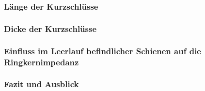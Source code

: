 \documentclass[accentcolor=tud9b, colorbacktitle, inverttitle]{tudbeamer}
\begin{document}
\begin{frame}\frametitle{Länge der Kurzschlüsse}
\end{frame}


\begin{frame}\frametitle{Dicke der Kurzschlüsse}
\end{frame}




\begin{frame}\frametitle{Einfluss im Leerlauf befindlicher Schienen auf die Ringkernimpedanz}
\end{frame}



\begin{frame}\frametitle{Fazit und Ausblick}
%             

\end{frame}

% 	 
\end{document}
